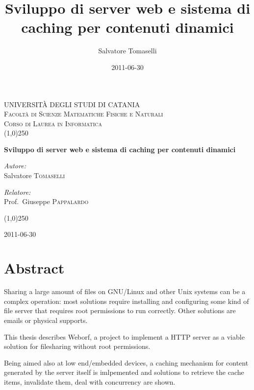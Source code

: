 \documentclass[a4paper,11pt]{article}
\date{2011-06-30}
\title{Sviluppo di server web e sistema di caching per contenuti dinamici}
\author{Salvatore Tomaselli}
\begin{document}
\begin{titlepage}
\begin{center}

\textsc{\LARGE UNIVERSIT\`{A} DEGLI STUDI DI CATANIA}\\[0.5cm]

\textsc{\Large Facolt\`{a} di Scienze Matematiche Fisiche e Naturali}\\[0.5cm]
\textsc{\Large Corso di Laurea in Informatica}\\[0.5cm]


\line(1,0){250}


{ \huge \bfseries Sviluppo di server web e sistema di caching per contenuti dinamici}\\[0.4cm]

\begin{minipage}{0.4\textwidth}
\begin{flushleft} \large
\emph{Autore:}\\
Salvatore \textsc{Tomaselli}
\end{flushleft}
\end{minipage}
\begin{minipage}{0.4\textwidth}
\begin{flushright} \large
\emph{Relatore:} \\
Prof.~Giuseppe \textsc{Pappalardo}
\end{flushright}
\end{minipage}

\vfill
\line(1,0){250}

{\large 2011-06-30}



\end{center}
\end{titlepage}

\section{Abstract}
Sharing a large amount of files on GNU/Linux and other Unix systems can be a complex operation:
most solutions require installing and configuring some kind of file server that requires root permissions to run correctly. Other solutions are emails or physical supports.

This thesis describes Weborf, a project to implement a HTTP server as a viable solution for filesharing without root permissions.

Being aimed also at low end/embedded devices, a caching mechanism for content generated by the server itself is imlpemented and solutions to retrieve the cache items, invalidate them, deal with concurrency are shown.
\end{document}
